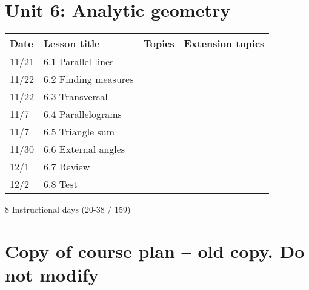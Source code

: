 \section*{Unit 6: Analytic geometry}
\begin{tabular}{|p{0.9cm}|p{4cm}|p{7cm}|p{5cm}|}
  \hline
  Date & Lesson title & Topics  & Extension topics \\
  \hline
  11/21 & 6.1 Parallel lines &  &  \\
  \hline
  11/22 & 6.2 Finding measures &  &  \\
  \hline
  11/22 & 6.3 Transversal &  &  \\
  \hline
  11/7 & 6.4 Parallelograms &  &  \\
  \hline
  11/7 & 6.5 Triangle sum &  &  \\
  \hline
  11/30 & 6.6 External angles &  & \\
  \hline
  12/1 & 6.7 Review &  &  \\
  \hline
  12/2 & 6.8 Test &  & \\
  \hline

\end{tabular} \par \vspace*{0.3cm}
8 Instructional days (20-38 / 159)


\newpage

\section*{Copy of course plan -- old copy. Do not modify}


